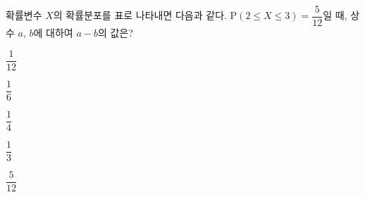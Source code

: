 확률변수 $X$의 확률분포를 표로 나타내면 다음과 같다. $\mathrm{P}(2\le X\le 3)=\dfrac{5}{12}$일 때, 상수 $a$, $b$에 대하여 $a-b$의 값은?
\par\smallskip\begin{center}\resizebox{\ifdim\width>\linewidth\linewidth\else\width\fi}{!}{}\end{center}
\begin{choicesii}{\rule[-3ex]{0pt}{8ex}$\dfrac{1}{12}$}{\rule[-3ex]{0pt}{8ex}$\dfrac{1}{6}$}{\rule[-3ex]{0pt}{8ex}$\dfrac{1}{4}$}{\rule[-3ex]{0pt}{8ex}$\dfrac{1}{3}$}{\rule[-3ex]{0pt}{8ex}$\dfrac{5}{12}$}\end{choicesii}
